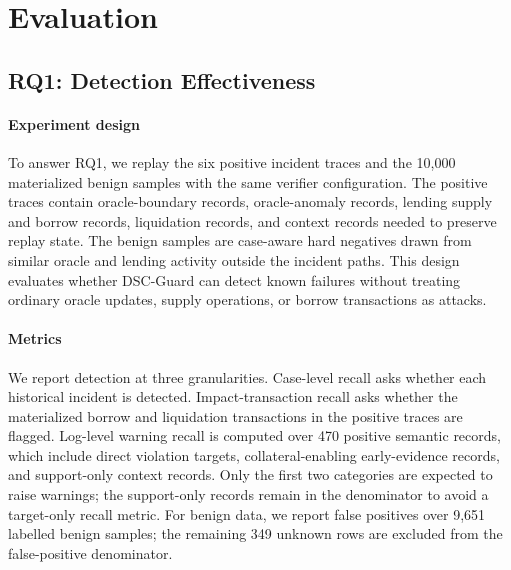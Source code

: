 \documentclass[final,5p]{elsarticle}
\newcommand{\tool}{DSC-Guard\xspace}
\begin{document}
\section{Evaluation}
\label{sec:evaluation}

\subsection{RQ1: Detection Effectiveness}

\paragraph{Experiment design}
To answer RQ1, we replay the six positive incident traces and the 10,000 materialized benign samples with the same verifier configuration.
The positive traces contain oracle-boundary records, oracle-anomaly records, lending supply and borrow records, liquidation records, and context records needed to preserve replay state.
The benign samples are case-aware hard negatives drawn from similar oracle and lending activity outside the incident paths.
This design evaluates whether \tool can detect known failures without treating ordinary oracle updates, supply operations, or borrow transactions as attacks.

\paragraph{Metrics}
We report detection at three granularities.
Case-level recall asks whether each historical incident is detected.
Impact-transaction recall asks whether the materialized borrow and liquidation transactions in the positive traces are flagged.
Log-level warning recall is computed over 470 positive semantic records, which include direct violation targets, collateral-enabling early-evidence records, and support-only context records.
Only the first two categories are expected to raise warnings; the support-only records remain in the denominator to avoid a target-only recall metric.
For benign data, we report false positives over 9,651 labelled benign samples; the remaining 349 unknown rows are excluded from the false-positive denominator.
\end{document}
